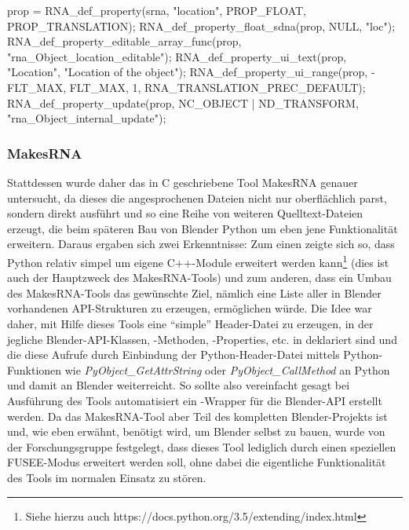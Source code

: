 \begin{code}[caption={Deklaration der Property \protect\emph{location} der Klasse \protect\emph{Object} in \protect\emph{rna\_object.c}},label={lst:locdecl}]
	prop = RNA_def_property(srna, "location", PROP_FLOAT, PROP_TRANSLATION);
	RNA_def_property_float_sdna(prop, NULL, "loc");
	RNA_def_property_editable_array_func(prop, "rna_Object_location_editable");
	RNA_def_property_ui_text(prop, "Location", "Location of the object");
	RNA_def_property_ui_range(prop, -FLT_MAX, FLT_MAX, 1, RNA_TRANSLATION_PREC_DEFAULT);
	RNA_def_property_update(prop, NC_OBJECT | ND_TRANSFORM, "rna_Object_internal_update");
\end{code}

\subsubsection{MakesRNA}

Stattdessen wurde daher das in C geschriebene Tool MakesRNA genauer untersucht, da dieses die angesprochenen Dateien nicht nur oberflächlich parst, sondern direkt ausführt und so eine Reihe von weiteren Quelltext-Dateien erzeugt, die beim späteren Bau von Blender Python um eben jene Funktionalität erweitern. Daraus ergaben sich zwei Erkenntnisse: Zum einen zeigte sich so, dass Python relativ simpel um eigene C++-Module erweitert werden kann\footnote{Siehe hierzu auch {https://docs.python.org/3.5/extending/index.html}} (dies ist auch der Hauptzweck des MakesRNA-Tools) und zum anderen, dass ein Umbau des MakesRNA-Tools das gewünschte Ziel, nämlich eine Liste aller in Blender vorhandenen API-Strukturen zu erzeugen, ermöglichen würde. Die Idee war daher, mit Hilfe dieses Tools eine \enquote{simple} Header-Datei zu erzeugen, in der jegliche Blender-API-Klassen, -Methoden, -Properties, etc. in \CC{} deklariert sind und die diese Aufrufe durch Einbindung der Python-Header-Datei mittels Python-Funktionen wie \emph{PyObject\_GetAttrString} oder \emph{PyObject\_CallMethod} an Python und damit an Blender weiterreicht. So sollte also vereinfacht gesagt bei Ausführung des Tools automatisiert ein \CC{}-Wrapper für die Blender-API erstellt werden. Da das MakesRNA-Tool aber Teil des kompletten Blender-Projekts ist und, wie eben erwähnt, benötigt wird, um Blender selbst zu bauen, wurde von der Forschungsgruppe festgelegt, dass dieses Tool lediglich durch einen speziellen FUSEE-Modus erweitert werden soll, ohne dabei die eigentliche Funktionalität des Tools im normalen Einsatz zu stören. 

